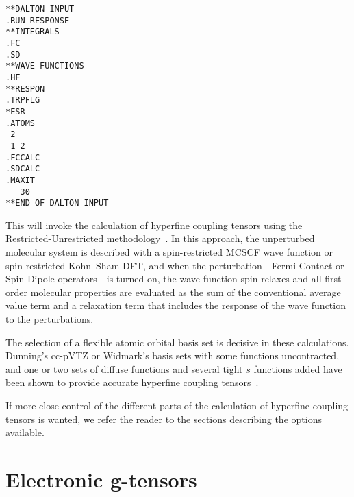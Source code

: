 \begin{verbatim}
**DALTON INPUT
.RUN RESPONSE
**INTEGRALS
.FC
.SD
**WAVE FUNCTIONS
.HF
**RESPON
.TRPFLG
*ESR
.ATOMS
 2
 1 2
.FCCALC
.SDCALC
.MAXIT
   30
**END OF DALTON INPUT
\end{verbatim}
%

    This will invoke the calculation of hyperfine
coupling tensors
using the Restricted-Unrestricted
methodology~\cite{bfpjjbjothhjajjcp97}. In this approach, the
unperturbed molecular system is described with a spin-restricted MCSCF
wave function or spin-restricted Kohn--Sham DFT, and when the perturbation---Fermi Contact or Spin Dipole
operators---is turned on, the wave function spin relaxes and all
first-order molecular properties are evaluated as the sum of the
conventional average value term and a relaxation term that includes
the response of the wave function to the perturbations.

    The selection of a flexible atomic orbital basis set is decisive
in these calculations. Dunning's cc-pVTZ or Widmark's basis sets with some
functions uncontracted, and one or two sets of diffuse functions and
several tight $s$ functions added have been shown to provide accurate
hyperfine coupling tensors~\cite{bfpjcpl232}.

    If more close control of the different parts of the calculation
of hyperfine coupling tensors is wanted, we refer the reader to the
sections describing the options available.

\section{Electronic g-tensors}

\begin{center}
\end{center}

